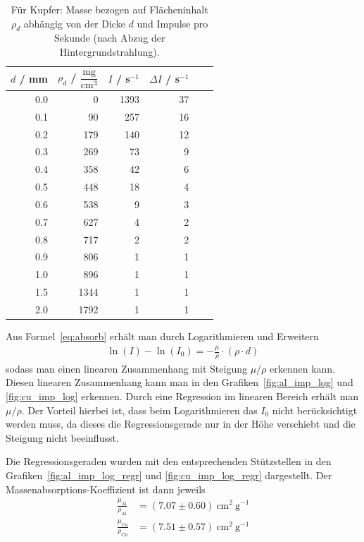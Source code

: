 \documentclass{article}
\begin{document}
\begin{table}[H]
\caption{Für Kupfer: Masse bezogen auf Flächeninhalt $\rho_d$ abhängig von der Dicke $d$ und Impulse pro Sekunde (nach Abzug der Hintergrundstrahlung).}
\begin{tabular}{rrrrrr}
$d$ / mm & $\rho_d$ / $\dfrac{\text{mg}}{\text{cm}^3}$ & $I$ / s$^{-1}$ & $\Delta I$ / s$^{-1}$ \\
\hline
0.0      &      0        &      1393     &      37 \\
0.1      &      90       &      257      &      16 \\
0.2      &      179      &      140      &      12 \\
0.3      &      269      &      73       &      9 \\
0.4      &      358      &      42       &      6 \\
0.5      &      448      &      18       &      4 \\
0.6      &      538      &      9        &      3 \\
0.7      &      627      &      4        &      2 \\
0.8      &      717      &      2        &      2 \\
0.9      &      806      &      1        &      1 \\
1.0      &      896      &      1        &      1 \\
1.5      &      1344     &      1        &      1 \\
2.0      &      1792     &      1        &      1 
\end{tabular}
\end{table}



Aus Formel~\eqref{eq:absorb} erhält man durch Logarithmieren und Erweitern
\begin{align*}
\operatorname{ln}(I) -\operatorname{ln}(I_0) = -\frac{\mu}{\rho} \cdot \left(\rho \cdot d\right)
\end{align*}
sodass man einen linearen Zusammenhang mit Steigung $\mu/\rho$ erkennen kann. Diesen linearen Zusammenhang kann man in den Grafiken~\ref{fig:al_imp_log} und \ref{fig:cu_imp_log} erkennen. Durch eine Regression im linearen Bereich erhält man $\mu/\rho$. Der Vorteil hierbei ist, dass beim Logarithmieren das $I_0$ nicht berücksichtigt werden muss, da dieses die Regressionsgerade nur in der Höhe verschiebt und die Steigung nicht beeinflusst.

Die Regressionsgeraden wurden mit den entsprechenden Stützstellen in den Grafiken~\ref{fig:al_imp_log_regr} und \ref{fig:cu_imp_log_regr} dargestellt. Der Massenabsorptions-Koeffizient ist dann jeweils
\begin{align*}
\frac{\mu_{\text{Al}}}{\rho_{\text{Al}}} &= (7.07 \pm 0.60)~\text{cm}^2~\text{g}^{-1} \\
\frac{\mu_{\text{Cu}}}{\rho_{\text{Cu}}} &= (7.51 \pm 0.57)~\text{cm}^2~\text{g}^{-1}
\end{align*}
\end{document}
